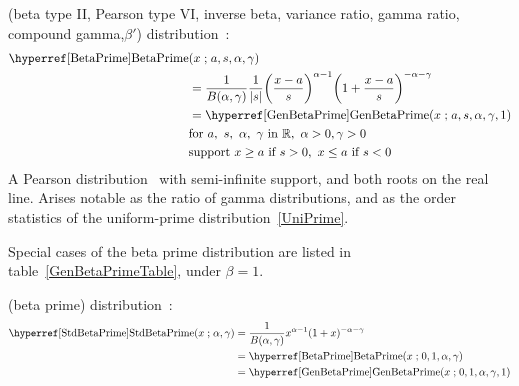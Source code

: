 

\label{sec:BetaPrime}



 (beta type II, Pearson type VI, inverse beta, variance ratio, gamma ratio, compound gamma,$\beta'$) distribution~\cite{Pearson1901,Johnson1995}:
\begin{align}
\label{BetaPrime}
\opr{BetaPrime}&(x\given  a, s,\alpha, \gamma) \\ \notag&= \frac{1}{B(\alpha,\gamma)}\frac{1}{|s|} \Left(\frac{x-a}{s}\Right)^{\alpha -1} \Left(1+\frac{x-a}{s}\Right)^{-\alpha-\gamma }  \checked
\\
&= \opr{GenBetaPrime}(x\given a,s, \alpha,\gamma,1) \notag \checked
\\
& \text{for }  a,\ s,\ \alpha,\ \gamma \text{ in } \Real, \  \alpha>0, \gamma>0  \checked
\notag \\ 
& \text{support } x \geq a \ \text{if}\ s > 0,  \ x\leq a  \ \text{if}\  s < 0 
\notag
\end{align}
A Pearson distribution~ with semi-infinite support, and both roots on the real line. Arises notable as the ratio of gamma distributions, and as the order statistics of the uniform-prime distribution~\eqref{UniPrime}.



Special cases of the beta prime distribution are listed in table~\ref{GenBetaPrimeTable}, under $\beta=1$.


 (beta prime) distribution~\cite{Pearson1901}:
\begin{align}
\label{StdBetaPrime}
\opr{StdBetaPrime}(x\given \alpha, \gamma) &= \frac{1}{B(\alpha,\gamma)} x^{\alpha -1} (1+x )^{-\alpha-\gamma } \checked
\\&= \opr{BetaPrime}(x\given  0,1, \alpha,\gamma) \notag	\checked
\\&= \opr{GenBetaPrime}(x\given  0,1, \alpha,\gamma,1) \notag \checked
\end{align}


